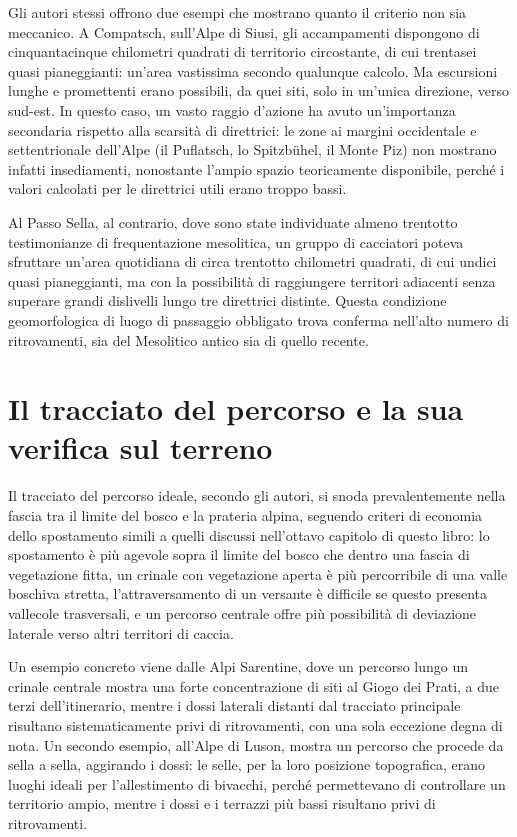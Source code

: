 Gli autori stessi offrono due esempi che mostrano quanto il criterio non sia meccanico. A Compatsch, sull'Alpe di Siusi, gli accampamenti dispongono di cinquantacinque chilometri quadrati di territorio circostante, di cui trentasei quasi pianeggianti: un'area vastissima secondo qualunque calcolo. Ma escursioni lunghe e promettenti erano possibili, da quei siti, solo in un'unica direzione, verso sud-est. In questo caso, un vasto raggio d'azione ha avuto un'importanza secondaria rispetto alla scarsità di direttrici: le zone ai margini occidentale e settentrionale dell'Alpe (il Puflatsch, lo Spitzbühel, il Monte Piz) non mostrano infatti insediamenti, nonostante l'ampio spazio teoricamente disponibile, perché i valori calcolati per le direttrici utili erano troppo bassi.

Al Passo Sella, al contrario, dove sono state individuate almeno trentotto testimonianze di frequentazione mesolitica, un gruppo di cacciatori poteva sfruttare un'area quotidiana di circa trentotto chilometri quadrati, di cui undici quasi pianeggianti, ma con la possibilità di raggiungere territori adiacenti senza superare grandi dislivelli lungo tre direttrici distinte. Questa condizione geomorfologica di luogo di passaggio obbligato trova conferma nell'alto numero di ritrovamenti, sia del Mesolitico antico sia di quello recente.

\section{Il tracciato del percorso e la sua verifica sul terreno}

Il tracciato del percorso ideale, secondo gli autori, si snoda prevalentemente nella fascia tra il limite del bosco e la prateria alpina, seguendo criteri di economia dello spostamento simili a quelli discussi nell'ottavo capitolo di questo libro: lo spostamento è più agevole sopra il limite del bosco che dentro una fascia di vegetazione fitta, un crinale con vegetazione aperta è più percorribile di una valle boschiva stretta, l'attraversamento di un versante è difficile se questo presenta vallecole trasversali, e un percorso centrale offre più possibilità di deviazione laterale verso altri territori di caccia.

Un esempio concreto viene dalle Alpi Sarentine, dove un percorso lungo un crinale centrale mostra una forte concentrazione di siti al Giogo dei Prati, a due terzi dell'itinerario, mentre i dossi laterali distanti dal tracciato principale risultano sistematicamente privi di ritrovamenti, con una sola eccezione degna di nota. Un secondo esempio, all'Alpe di Luson, mostra un percorso che procede da sella a sella, aggirando i dossi: le selle, per la loro posizione topografica, erano luoghi ideali per l'allestimento di bivacchi, perché permettevano di controllare un territorio ampio, mentre i dossi e i terrazzi più bassi risultano privi di ritrovamenti.

